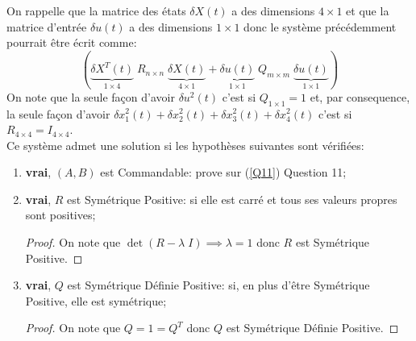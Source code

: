 \documentclass[class=article, crop=false]{standalone}
\begin{document}
\begin{resolution}
    On rappelle que la matrice des états $\delta X(t)$ a des dimensions $4\times 1$ et que la matrice d'entrée $\delta u(t)$ a des dimensions $1\times 1$ donc le système précédemment pourrait être écrit comme:
    \begin{equation*}
        ( 
            \underbrace{\delta X^T(t)}_{1\times 4}
            \; 
            {R}_{n\times n}
            \;
            \underbrace{\delta X(t)}_{4\times 1}
            + 
            \underbrace{\delta u(t)}_{1\times 1}
            \;
            {Q}_{m\times m}
            \;
            \underbrace{\delta u(t)}_{1\times 1}
        )
    \end{equation*}
    On note que la seule façon d'avoir $\delta u^2(t)$ c'est si $Q_{1\times 1} = 1$ et, par consequence, la seule façon d'avoir $\delta x^2_1(t) + \delta x^2_2(t) + \delta x^2_3(t) + \delta x^2_4(t)$ c'est si $R_{4\times 4} = I_{4\times 4}$.\\

    Ce système admet une solution si les hypothèses suivantes sont vérifiées:
    \begin{enumerate}[rightmargin = \leftmargin]
        \item \textbf{vrai}, $(A, B)$ est Commandable: prove sur (\ref{Q11}) Question 11;
        
        \item \textbf{vrai}, $R$ est Symétrique Positive: si elle est carré et tous ses valeurs propres sont positives;
        \begin{proof}
            On note que $\det(R - \lambda \; I ) \implies \lambda = 1$ donc $R$ est Symétrique Positive.
        \end{proof}

        \item \textbf{vrai}, $Q$ est Symétrique Définie Positive: si, en plus d'être Symétrique Positive, elle est symétrique;
        \begin{proof}
            On note que $Q = 1 = Q^T$ donc $Q$ est Symétrique Définie Positive. 
        \end{proof}


\end{enumerate}
\end{resolution}
\end{document}
